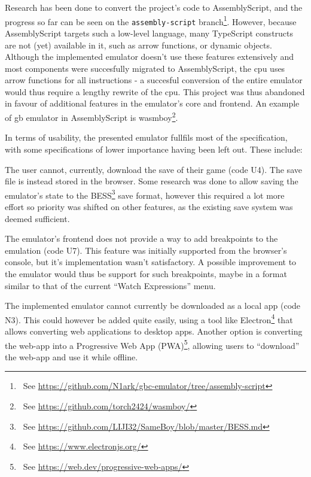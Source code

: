 \documentclass[11pt]{informatics-report}
\newcommand{\ftnt}[1]{\footnote{~See \url{#1}}}
\begin{document}
Research has been done to convert the project's code to AssemblyScript, and the progress so far can be seen on the \texttt{assembly-script} branch\ftnt{https://github.com/N1ark/gbc-emulator/tree/assembly-script}. However, because AssemblyScript targets such a low-level language, many TypeScript constructs are not (yet) available in it, such as arrow functions, or dynamic objects. Although the implemented emulator doesn't use these features extensively and most components were succesfully migrated to AssemblyScript, the \gls{cpu} uses arrow functions for all instructions - a succesful conversion of the entire emulator would thus require a lengthy rewrite of the \gls{cpu}. This project was thus abandoned in favour of additional features in the emulator's core and frontend. An example of \gls{gb} emulator in AssemblyScript is wasmboy\ftnt{https://github.com/torch2424/wasmboy/}.

In terms of usability, the presented emulator fullfils most of the specification, with some specifications of lower importance having been left out. These include:

\begin{compactitem}
	\item The user cannot, currently, download the save of their game (code U4).	 The save file is instead stored in the browser. Some research was done to allow saving the emulator's state to the BESS\ftnt{https://github.com/LIJI32/SameBoy/blob/master/BESS.md} save format, however this required a lot more effort so priority was shifted on other features, as the existing save system was deemed sufficient.
	\item The emulator's frontend does not provide a way to add breakpoints to the emulation (code U7). This feature was initially supported from the browser's console, but it's implementation wasn't satisfactory. A possible improvement to the emulator would thus be support for such breakpoints, maybe in a format similar to that of the current ``Watch Expressions'' menu.
	\item The implemented emulator cannot currently be downloaded as a local app (code N3). This could however be added quite easily, using a tool like Electron\ftnt{https://www.electronjs.org/} that allows converting web applications to desktop apps. Another option is converting the web-app into a Progressive Web App (PWA)\ftnt{https://web.dev/progressive-web-apps/}, allowing users to ``download'' the web-app and use it while offline.
\end{compactitem}
\end{document}
